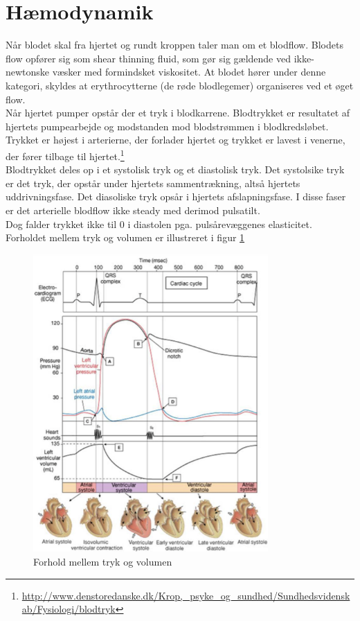 \section{Hæmodynamik}
Når blodet skal fra hjertet og rundt kroppen taler man om et blodflow. Blodets flow opfører sig som shear thinning fluid, som gør sig gældende ved ikke-newtonske væsker med formindsket viskositet. At blodet hører under denne kategori, skyldes at erythrocytterne (de røde blodlegemer) organiseres ved et øget flow. \\
Når hjertet pumper opstår der et tryk i blodkarrene. Blodtrykket er resultatet af hjertets pumpearbejde og modstanden mod blodstrømmen i blodkredsløbet. Trykket er højest i arterierne, der forlader hjertet og trykket er lavest i venerne, der fører tilbage til hjertet.\footnote{\url{http://www.denstoredanske.dk/Krop,_psyke_og_sundhed/Sundhedsvidenskab/Fysiologi/blodtryk}}\\
Blodtrykket deles op i et systolisk tryk og et diastolisk tryk. Det systolsike tryk er det tryk, der opstår under hjertets sammentrækning, altså hjertets uddrivningsfase. Det diasoliske tryk opsår i hjertets afslapningsfase. I disse faser er det arterielle blodflow ikke steady med derimod pulsatilt. \\Dog falder trykket ikke til 0 i diastolen pga. pulsårevæggenes elasticitet. Forholdet mellem tryk og volumen er illustreret i figur \ref{tryk og volumen}
\begin{figure}[H]
	\centering
	\includegraphics[width=0.8\textwidth]{Figurer/Fysio/TrykOgVolumen}
	\caption{Forhold mellem tryk og volumen}
	\label{tryk og volumen}
\end{figure}
